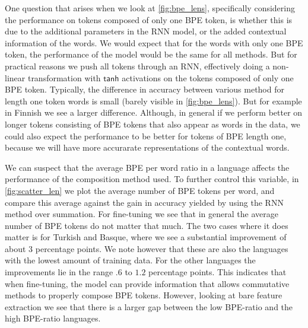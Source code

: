 \documentclass[11pt]{article}
\newcommand\jp[1]{(\textbf{JP:} #1)}
\newcommand\adam[1]{(\textbf{Adam:} #1)}
\begin{document}

    

               One question that arises when we look at
     \cref{fig:bpe_lens}, specifically considering the performance on
     tokens composed of only one BPE token, is whether this is due to
     the additional parameters in the RNN model, or the added
     contextual information of the words. We would expect that for the
     words with only one BPE token, the performance of the model would
     be the same for all methods. But for practical reasons we push
     all tokens through an RNN, effectively doing a non-linear
     transformation with $\mathsf{tanh}$ activations on the tokens
     composed of only one BPE token.
                Typically, the difference in accuracy between various
     method for length one token words is small (barely visible in
     \cref{fig:bpe_lens}). But for example in Finnish we see a larger
     difference. Although, in general if we perform better on longer
     tokens consisting of BPE tokens that also appear as words in the
     data, we could also expect the performance to be better for
     tokens of BPE length one, because we will have more accurarate
     representations of the contextual words.


             We can suspect that the average BPE per word ratio in a
     language affects the performance of the composition method
     used. To further control this variable, in \cref{fig:scatter_len}
     we plot the average number of BPE tokens per word, and compare
     this average against the gain in accuracy yielded by using the
     RNN method over summation.  For fine-tuning we see that in
     general the average number of BPE tokens do not matter that
     much. The two cases where it does matter is for Turkish and
     Basque, where we see a substantial improvement of about $3$
     percentage points. We note however that these are also the
     languages with the lowest amount of training data.
        For the other languages the improvements lie in the range $.6$
     to $1.2$ percentage points. This indicates that when fine-tuning,
     the model can provide information that allows commutative methods
     to properly compose BPE tokens. However, looking at bare feature
     extraction we see that there is a larger gap between the low
     BPE-ratio and the high BPE-ratio languages.
\end{document}
